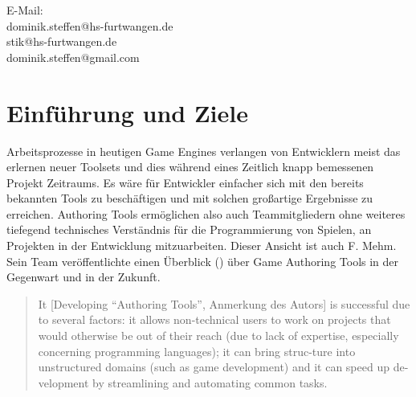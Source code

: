 \documentclass[pagesize, paper=a4, fontsize=12pt, titlepage=true, headings=small, headnosepline, abstractoff, liststotoc, nochapterprefix, plainheadsepline, twoside]{scrreprt}
\begin{document}
E-Mail:\\
dominik.steffen@hs-furtwangen.de\\
stik@hs-furtwangen.de\\
dominik.steffen@gmail.com\\
\endgroup
\newpage
\thispagestyle{empty}
\mbox{}

\begingroup
	\clearpage
	\renewcommand*{\chapterpagestyle}{empty}
	\pagestyle{empty}
	\tableofcontents
	\clearpage
\endgroup
\newpage
\thispagestyle{empty}
\mbox{}


\renewcommand*{\chapterpagestyle}{plain}
\pagestyle{plain}
\setcounter{page}{0}

\chapter{Einführung und Ziele}
Arbeitsprozesse in heutigen Game Engines verlangen von Entwicklern meist das erlernen neuer Toolsets und dies während eines Zeitlich knapp bemessenen Projekt Zeitraums. Es wäre für Entwickler einfacher sich mit den bereits bekannten Tools zu beschäftigen und mit solchen großartige Ergebnisse zu erreichen. Authoring Tools ermöglichen  also auch Teammitgliedern ohne weiteres tiefegend technisches Verständnis für die Programmierung von Spielen, an Projekten in der Entwicklung mitzuarbeiten. Dieser Ansicht ist auch F. Mehm. Sein Team veröffentlichte einen Überblick () über Game Authoring Tools in der Gegenwart und in der Zukunft. 

\begin{quote}
\glqq It [Developing “Authoring Tools”, Anmerkung des Autors] is successful due to several factors: it allows non-technical users to work on projects that would otherwise be out of their reach (due to lack of expertise, especially concerning programming languages); it can bring struc-ture into unstructured domains (such as game development) and it can speed up de-velopment by streamlining and automating common tasks.\grqq \ \cite{FutureTrendsGAT:2012}
\end{quote}
\end{document}
